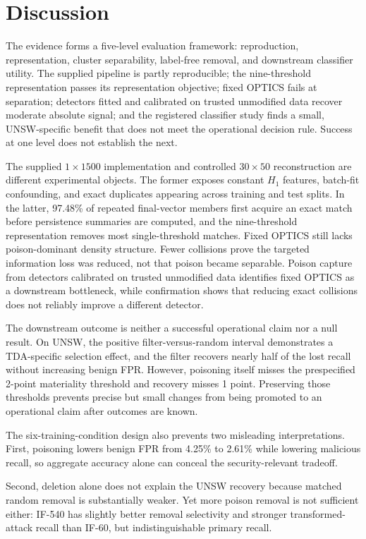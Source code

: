 \documentclass[conference]{IEEEtran}
\begin{document}
\section{Discussion}
The evidence forms a five-level evaluation framework: reproduction,
representation, cluster separability, label-free removal, and downstream
classifier utility. The supplied pipeline is partly reproducible; the
nine-threshold representation
passes its representation objective; fixed OPTICS fails at separation;
detectors fitted and calibrated on trusted unmodified data recover moderate
absolute signal; and the registered
classifier study finds a small, UNSW-specific benefit that does not meet the
operational decision rule. Success at one level does not establish the next.

The supplied $1\times1500$ implementation and controlled $30\times50$
reconstruction are different experimental objects. The former exposes
constant $H_1$ features, batch-fit confounding, and exact duplicates appearing
across training and test splits. In the latter, 97.48\% of repeated
final-vector members first acquire an exact match before persistence summaries
are computed, and the nine-threshold representation removes most
single-threshold matches. Fixed OPTICS still lacks poison-dominant density
structure. Fewer collisions prove the targeted information loss was reduced, not that
poison became separable. Poison capture from detectors calibrated on trusted
unmodified data identifies fixed OPTICS as a
downstream bottleneck, while confirmation shows that reducing exact collisions
does not reliably improve a different detector.

The downstream outcome is neither a successful operational claim nor a null
result. On UNSW, the positive filter-versus-random interval demonstrates a
TDA-specific selection effect, and the filter recovers nearly half of the lost
recall without increasing benign FPR. However, poisoning itself misses the
prespecified 2-point materiality threshold and recovery misses 1 point. Preserving
those thresholds prevents precise but small changes from being promoted to an
operational claim after outcomes are known.

The six-training-condition design also prevents two misleading interpretations. First,
poisoning lowers benign FPR from 4.25\% to 2.61\% while lowering malicious
recall, so aggregate accuracy alone can conceal the security-relevant tradeoff.

Second, deletion alone does not explain the UNSW recovery because matched
random removal is substantially weaker. Yet more poison removal is not
sufficient either: IF-540 has slightly better removal selectivity and stronger
transformed-attack recall than IF-60, but indistinguishable primary recall.
\end{document}
